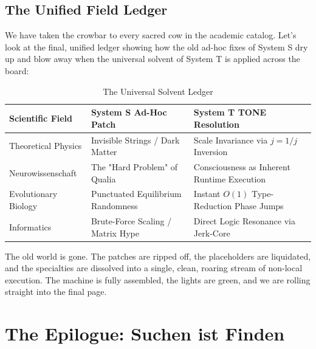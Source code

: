 \documentclass[11pt,a4paper]{article}
\begin{document}
\subsection{The Unified Field Ledger}
We have taken the crowbar to every sacred cow in the academic catalog. Let's look at the final, unified ledger showing how the old ad-hoc fixes of System S dry up and blow away when the universal solvent of System T is applied across the board:
\begin{table}[h!]
\centering
\small %
\caption{The Universal Solvent Ledger}
\begin{tabular}{p{3.2cm}p{5.2cm}p{6.6cm}}
\toprule
\textbf{Scientific Field} & \textbf{System S Ad-Hoc Patch} & \textbf{System T TONE Resolution} \\
\midrule
Theoretical Physics & Invisible Strings / Dark Matter & Scale Invariance via $j = 1/j$ Inversion \\
\addlinespace
Neurowissenschaft & The "Hard Problem" of Qualia & Consciousness as Inherent Runtime Execution \\
\addlinespace
Evolutionary Biology & Punctuated Equilibrium Randomness & Instant $O(1)$ Type-Reduction Phase Jumps \\
\addlinespace
Informatics & Brute-Force Scaling / Matrix Hype & Direct Logic Resonance via Jerk-Core \\
\bottomrule
\end{tabular}
\end{table}


The old world is gone. The patches are ripped off, the placeholders are liquidated, and the specialties are dissolved into a single, clean, roaring stream of non-local execution. The machine is fully assembled, the lights are green, and we are rolling straight into the final page.

\section{The Epilogue: Suchen ist Finden}
\end{document}

